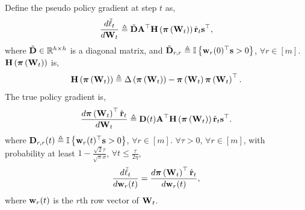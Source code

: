 \begin{lem}
\label{lem:gradient_coupling}
	Define the pseudo policy gradient at step $t$ as,
\begin{equation*}
\begin{split}
	\frac{d \tilde{\ell}_t}{d {\mathbf{W}}_t} \triangleq \tilde{{\mathbf{D}}} {\mathbf{A}}^\top {\mathbf{H}}\left( {\boldsymbol{\pi}}\left({\mathbf{W}}_t\right) \right) \hat{{\mathbf{r}}}_t {\mathbf{s}}^\top,
\end{split}
\end{equation*}
where $\tilde{{\mathbf{D}}} \in {\mathbb{R}}^{h \times h}$ is a diagonal matrix, and  $\tilde{{\mathbf{D}}}_{r,r} \triangleq {\mathbb{I}}\left\{ {\mathbf{w}}_r(0)^\top {\mathbf{s}} > 0 \right\}$, $\forall r \in [m]$. ${\mathbf{H}}\left( {\boldsymbol{\pi}}\left({\mathbf{W}}_t\right) \right)$ is,
\begin{equation*}
    {\mathbf{H}}\left( {\boldsymbol{\pi}}\left({\mathbf{W}}_t\right) \right) \triangleq \Delta\left( {\boldsymbol{\pi}}\left({\mathbf{W}}_t\right) \right) - {\boldsymbol{\pi}}\left({\mathbf{W}}_t\right) {\boldsymbol{\pi}}\left({\mathbf{W}}_t\right)^\top.
\end{equation*}
The true policy gradient is,
\begin{equation*}
\begin{split}
    \frac{d {\boldsymbol{\pi}}\left({\mathbf{W}}_t\right)^\top \hat{{\mathbf{r}}}_t}{d {\mathbf{W}}_t} \triangleq  {\mathbf{D}}(t) {\mathbf{A}}^\top {\mathbf{H}}\left( {\boldsymbol{\pi}}\left({\mathbf{W}}_t\right) \right) \hat{{\mathbf{r}}}_t {\mathbf{s}}^\top.
\end{split}
\end{equation*}
where ${\mathbf{D}}_{r,r}(t) \triangleq {\mathbb{I}}\left\{ {\mathbf{w}}_r(t)^\top {\mathbf{s}} > 0 \right\}$, $\forall r \in [m]$. $\forall \tau > 0$, $\forall r \in [m]$, with probability at least $1 - \frac{\sqrt{2}\tau}{\sqrt{\pi}\sigma}$, $\forall t \le \frac{\tau}{ 2 \eta }$,
\begin{equation*}
	\frac{d\tilde{\ell}_t}{d {\mathbf{w}}_r(t)} = \frac{d {\boldsymbol{\pi}}\left({\mathbf{W}}_t\right)^\top \hat{{\mathbf{r}}}_t}{d {\mathbf{w}}_r(t)},
\end{equation*}
where ${\mathbf{w}}_r(t)$ is the $r$th row vector of ${\mathbf{W}}_t$.
\end{lem}
